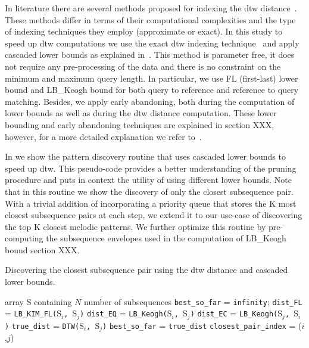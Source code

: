 In literature there are several methods proposed for indexing the \gls{dtw} distance~\citep{Keogh2004,vlachos2003indexing}. These methods differ in terms of their computational complexities and the type of indexing techniques they employ (approximate or exact). In this study to speed up \gls{dtw} computations we use the exact \gls{dtw} indexing technique~\citep{Keogh2004} and apply cascaded lower bounds as explained in~\cite{Rakthanmanon2013}. This method is parameter free, it does not require any pre-processing of the data and there is no constraint on the minimum and maximum query length. In particular, we use FL (first-last) lower bound and LB\_Keogh bound for both query to reference and reference to query matching. Besides, we apply early abandoning, both during the computation of lower bounds as well as during the \gls{dtw} distance computation. These lower bounding and early abandoning techniques are explained in section XXX, however, for a more detailed explanation we refer to~\cite{Rakthanmanon2013}. 

In  we show the pattern discovery routine that uses cascaded lower bounds to speed up \gls{dtw}. This pseudo-code provides a better understanding of the pruning procedure and puts in context the utility of using different lower bounds. Note that in this routine we show the discovery of only the closest subsequence pair. With a trivial addition of incorporating a priority queue that stores the K most closest subsequence pairs at each step, we extend it to our use-case of discovering the top K closest melodic patterns. We further optimize this routine by pre-computing the subsequence envelopes used in the computation of LB\_Keogh bound section XXX.

\renewcommand{\algorithmiccomment}[1]{\bgroup\hfill\tiny//~#1\egroup}
\begin{algorithm}
\caption{Discovering the closest subsequence pair using the \gls{dtw} distance and cascaded lower bounds.}
\label{alg:algorithmdiscovery}
	\begin{algorithmic} 
	
	 array $\mathrm{S}$ containing $N$ number of subsequences
	\State \texttt{best\_so\_far} = \texttt{infinity};
			\State  \texttt{dist\_FL} = \texttt{LB\_KIM\_FL($\mathrm{S}_i$, $\mathrm{S}_j$)}			
				\State  \texttt{dist\_EQ} = \texttt{LB\_Keogh($\mathrm{S}_i$, $\mathrm{S}_j$)}				
					\State  \texttt{dist\_EC} = \texttt{LB\_Keogh($\mathrm{S}_j$, $\mathrm{S}_i$)}					
						\State  \texttt{true\_dist} = \texttt{DTW($\mathrm{S}_i$, $\mathrm{S}_j$)}						
							\State \texttt{best\_so\_far} = \texttt{true\_dist}
							\State \texttt{closest\_pair\_index} = ($i$,$j$)							
						\EndIf
					\EndIf
				\EndIf
			\EndIf
		\EndFor
	\EndFor
	
	\end{algorithmic}
\end{algorithm}
				

